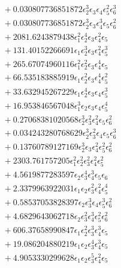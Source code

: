 \documentclass[10pt]{article}
\begin{document}
\begin{align*}
&{}  + 0.030807736851872 \epsilon_{2}^{3} \epsilon_{3} \epsilon_{4} \epsilon_{5}^{2} \epsilon_{6}^{3} \\
&{}  + 0.030807736851872 \epsilon_{2}^{3} \epsilon_{3} \epsilon_{4}^{3} \epsilon_{5} \epsilon_{6}^{2} \\
&{}  + 2081.6243879438 \epsilon_{1}^{2} \epsilon_{2}^{4} \epsilon_{3} \epsilon_{4}^{2} \epsilon_{5} \\
&{}  + 131.40152266691 \epsilon_{1} \epsilon_{2}^{3} \epsilon_{3} \epsilon_{4}^{2} \epsilon_{5}^{3} \\
&{}  + 265.67074960116 \epsilon_{1}^{2} \epsilon_{2}^{2} \epsilon_{3} \epsilon_{4}^{4} \epsilon_{5} \\
&{}  + 66.535183885919 \epsilon_{1} \epsilon_{2}^{2} \epsilon_{3} \epsilon_{4}^{4} \epsilon_{5}^{2} \\
&{}  + 33.632945267229 \epsilon_{1} \epsilon_{2}^{4} \epsilon_{3} \epsilon_{4} \epsilon_{5}^{3} \\
&{}  + 16.953846567048 \epsilon_{1}^{3} \epsilon_{2} \epsilon_{3} \epsilon_{4} \epsilon_{5}^{4} \\
&{}  + 0.27068381020568 \epsilon_{2}^{3} \epsilon_{3}^{2} \epsilon_{4}^{2} \epsilon_{5} \epsilon_{6}^{2} \\
&{}  + 0.034243280768629 \epsilon_{2}^{3} \epsilon_{3}^{2} \epsilon_{4} \epsilon_{5} \epsilon_{6}^{3} \\
&{}  + 0.13760789127169 \epsilon_{2}^{3} \epsilon_{3} \epsilon_{4}^{2} \epsilon_{5}^{2} \epsilon_{6}^{2} \\
&{}  + 2303.761757205 \epsilon_{1}^{2} \epsilon_{2}^{2} \epsilon_{3}^{2} \epsilon_{4}^{2} \epsilon_{5}^{2} \\
&{}  + 4.5619877283597 \epsilon_{2} \epsilon_{3}^{4} \epsilon_{4}^{3} \epsilon_{5} \epsilon_{6} \\
&{}  + 2.3379963922031 \epsilon_{1} \epsilon_{2} \epsilon_{3}^{2} \epsilon_{4}^{2} \epsilon_{5}^{4} \\
&{}  + 0.58537053828397 \epsilon_{2} \epsilon_{3}^{3} \epsilon_{4} \epsilon_{5}^{3} \epsilon_{6}^{2} \\
&{}  + 4.6829643062718 \epsilon_{2} \epsilon_{3}^{2} \epsilon_{4}^{3} \epsilon_{5}^{2} \epsilon_{6}^{2} \\
&{}  + 606.37658990847 \epsilon_{1} \epsilon_{2}^{2} \epsilon_{3}^{3} \epsilon_{4}^{3} \epsilon_{5} \\
&{}  + 19.086204880219 \epsilon_{1} \epsilon_{2} \epsilon_{3}^{4} \epsilon_{4}^{3} \epsilon_{5} \\
&{}  + 4.9053330299628 \epsilon_{1} \epsilon_{2} \epsilon_{3}^{5} \epsilon_{4}^{2} \epsilon_{5} \\

\end{align*}
\end{document}
